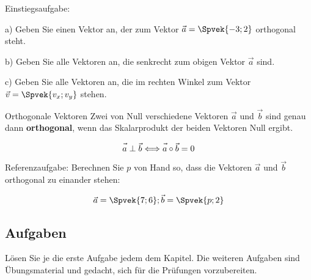 Einstiegsaufgabe:

a) Geben Sie einen Vektor an, der zum Vektor $\vec{a} = \Spvek{-3;2}$
orthogonal steht.

b) Geben Sie alle Vektoren an, die senkrecht zum obigen Vektor $\vec{a}$ sind.

c) Geben Sie alle Vektoren an, die im rechten Winkel zum Vektor $\vec{v} = \Spvek{v_x;
  v_y}$ stehen.




\begin{gesetz}{Orthogonale Vektoren}{}
  Zwei von Null verschiedene Vektoren $\vec{a}$ und $\vec{b}$ sind genau dann
  \textbf{orthogonal}, wenn das Skalarprodukt der beiden Vektoren
  Null ergibt.


  $$\vec{\vphantom{b}a} \perp \vec{b} \Longleftrightarrow
  \vec{\vphantom{b}a}\circ{}\vec{b} = 0$$
\end{gesetz}

Referenzaufgabe: Berechnen Sie $p$ von Hand so, dass die Vektoren $\vec{a}$ und $\vec{b}$ orthogonal zu einander stehen:

$$\vec{a} = \Spvek{7; 6}; \vec{b} = \Spvek{p; 2}$$



\subsection*{Aufgaben}

Lösen Sie je die erste Aufgabe jedem dem Kapitel. Die weiteren Aufgaben
sind Übungsmaterial und gedacht, sich für die Prüfungen vorzubereiten.

